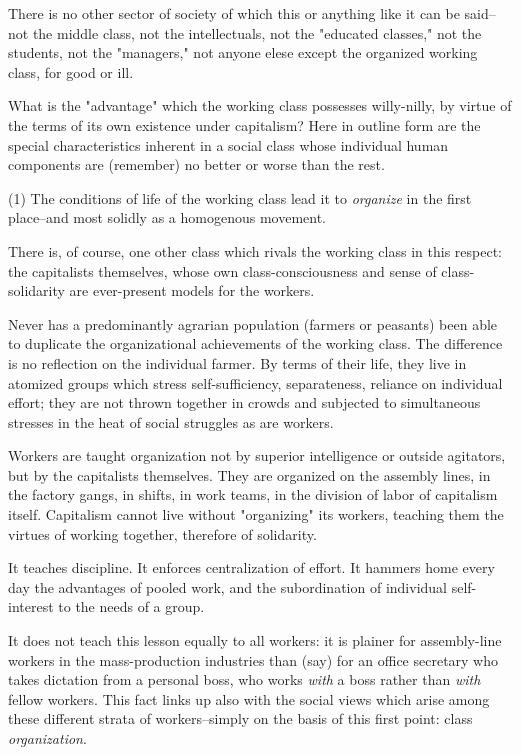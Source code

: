 There is no other sector of society of which this or anything like it can be said--not the middle class, not the intellectuals, not the "educated classes," not the students, not the "managers," not anyone elese except the organized working class, for good or ill.

What is the "advantage" which the working class possesses willy-nilly, by virtue of the terms of its own existence under capitalism? Here in outline form are the special characteristics inherent in a social class whose individual human components are (remember) no better or worse than the rest.

(1) The conditions of life of the working class lead it to \emph{organize} in the first place--and most solidly as a homogenous movement.

There is, of course, one other class which rivals the working class in this respect: the capitalists themselves, whose own class-consciousness and sense of class-solidarity are ever-present models for the workers.

Never has a predominantly agrarian population (farmers or peasants) been able to duplicate the organizational achievements of the working class. The difference is no reflection on the individual farmer. By terms of their life, they live in atomized groups which stress self-sufficiency, separateness, reliance on individual effort; they are not thrown together in crowds and subjected to simultaneous stresses in the heat of social struggles as are workers.

Workers are taught organization not by superior intelligence or outside agitators, but by the capitalists themselves. They are organized on the assembly lines, in the factory gangs, in shifts, in work teams, in the division of labor of capitalism itself. Capitalism cannot live without "organizing" its workers, teaching them the virtues of working together, therefore of solidarity.

It teaches discipline. It enforces centralization of effort. It hammers home every day the advantages of pooled work, and the subordination of individual self-interest to the needs of a group.

It does not teach this lesson equally to all workers: it is plainer for assembly-line workers in the mass-production industries than (say) for an office secretary who takes dictation from a personal boss, who works \emph{with} a boss rather than \emph{with} fellow workers. This fact links up also with the social views which arise among these different strata of workers--simply on the basis of this first point: class \emph{organization}.

